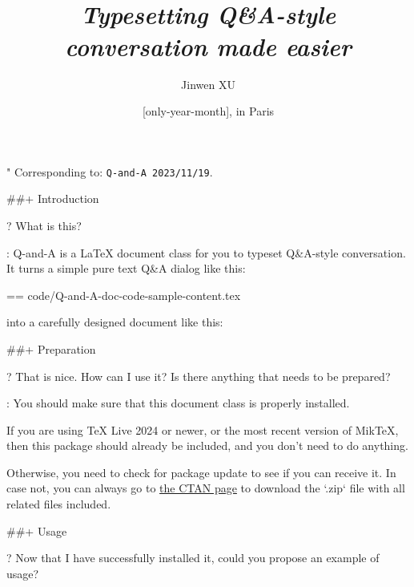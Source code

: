 \documentclass[%
  use style = classical,
  scroll,
]{Q-and-A}
\title{\QApackage{}\\\smallskip\itshape Typesetting Q\&A-style conversation made easier}
\author{Jinwen XU}
\date{\TheDate{\PackageVersion}[only-year-month], in Paris}
\def\PackageVersion{2023/11/19}
\def\PackageSubVersion{}
\newcommand{\QApackage}{{\normalfont\textsf{Q-and-A}}}
\begin{document}
\maketitle

"
  Corresponding to: {\normalfont\texttt{\QApackage{}~\PackageVersion\PackageSubVersion}}.


##+ {Introduction}

?
  What is this?

:
  \QApackage{} is a \LaTeX{} document class for you to typeset Q\&A-style conversation. It turns a simple pure text Q\&A dialog like this:

  == {code/Q-and-A-doc-code-sample-content.tex}

  into a carefully designed document like this:

  \begin{center}
  \end{center}


##+ {Preparation}

?
  That is nice. How can I use it? Is there anything that needs to be prepared?

:
  You should make sure that this document class is properly installed.

  If you are using TeX Live 2024 or newer, or the most recent version of MikTeX, then this package should already be included, and you don't need to do anything.

  Otherwise, you need to check for package update to see if you can receive it. In case not, you can always go to \href{https://ctan.org/pkg/Q-and-A}{the CTAN page} to download the `.zip` file with all related files included.


##+ {Usage}

?
  Now that I have successfully installed it, could you propose an example of usage?
\end{document}
